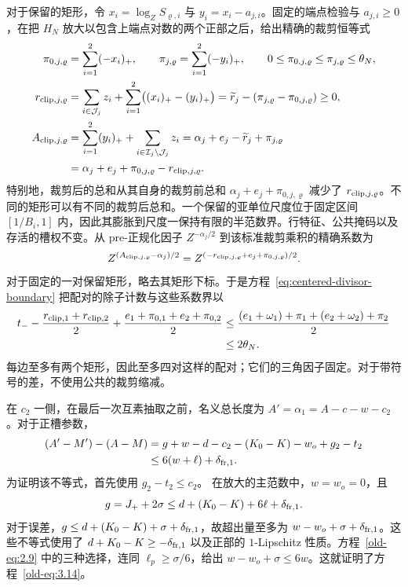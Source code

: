 对于保留的矩形，令 \(x_i=\log_ZS_{\varrho,i}\) 与 \(y_i=x_i-a_{j,i}\)。固定的端点检验与 \(a_{j,i}\ge0\)，在把 \(H_N\) 放大以包含上端点对数的两个正部之后，给出精确的裁剪恒等式
\begin{equation}
 \begin{aligned}
 \pi_{0,j,\varrho}&=\sum_{i=1}^2(-x_i)_+,\qquad
 \pi_{j,\varrho}=\sum_{i=1}^2(-y_i)_+,
 \qquad 0\le\pi_{0,j,\varrho}\le\pi_{j,\varrho}\le\theta_N,\\
 r_{{\rm clip},j,\varrho}
 &=\sum_{i\in\mathcal J_j}z_i+
       \sum_{i=1}^2\bigl((x_i)_+-(y_i)_+\bigr)
 =\widetilde r_j-(\pi_{j,\varrho}-\pi_{0,j,\varrho})\ge0,\\
 A_{{\rm clip},j,\varrho}
 &=\sum_{i=1}^2(y_i)_++\sum_{i\in\mathcal I_j\setminus\mathcal J_j}z_i
 =\alpha_j+e_j-\widetilde r_j+\pi_{j,\varrho}\\
 &=\alpha_j+e_j+\pi_{0,j,\varrho}-r_{{\rm clip},j,\varrho}.
 \end{aligned}
 \label{eq:centered-clipped-rectangle}
\end{equation}
特别地，裁剪后的总和从其自身的裁剪前总和 \(\alpha_j+e_j+\pi_{0,j,\varrho}\) 减少了 \(r_{{\rm clip},j,\varrho}\)。不同的矩形可以有不同的裁剪后总和。一个保留的亚单位尺度位于固定区间 \([1/B_i,1]\) 内，因此其膨胀到尺度一保持有限的半范数界。行特征、公共掩码以及存活的槽权不变。从 pre-正规化因子 \(Z^{-\alpha_j/2}\) 到该标准裁剪乘积的精确系数为
\[
 Z^{(A_{{\rm clip},j,\varrho}-\alpha_j)/2}
 =Z^{(-r_{{\rm clip},j,\varrho}+e_j+\pi_{0,j,\varrho})/2}.
\]
对于固定的一对保留矩形，略去其矩形下标。于是方程~\eqref{eq:centered-divisor-boundary} 把配对的除子计数与这些系数界以
\begin{equation}
 \begin{split}
 t_- -\frac{r_{{\rm clip},1}+r_{{\rm clip},2}}2
     +\frac{e_1+\pi_{0,1}+e_2+\pi_{0,2}}2
 &\le\frac{(e_1+\omega_1)+\pi_1+(e_2+\omega_2)+\pi_2}{2}\\
 &\le2\theta_N.
 \end{split}
 \label{eq:centered-clipped-shell}
\end{equation}
每边至多有两个矩形，因此至多四对这样的配对；它们的三角因子固定。对于带符号的差，不使用公共的裁剪缩减。

在 \(c_2\) 一侧，在最后一次互素抽取之前，名义总长度为 \(A'=\alpha_1=A-c-w-c_2\)。对于正槽参数，
\begin{equation}
 \begin{split}
 (A'-M')-(A-M)
 &=g+w-d-c_2-(K_0-K)-w_o+g_2-t_2\\
 &\le6(w+\ell)+\delta_{{\rm fr},1}.
 \end{split}
 \label{old-eq:3.14}
\end{equation}
为证明该不等式，首先使用 \(g_2-t_2\le c_2\)。
在放大的主范数中，\(w=w_o=0\)，且
\[
 g=J_++2\sigma
 \le d+(K_0-K)+6\ell+\delta_{{\rm fr},1}.
\]
对于误差，\(g\le d+(K_0-K)+\sigma+\delta_{{\rm fr},1}\)，故超出量至多为 \(w-w_o+\sigma+\delta_{{\rm fr},1}\)。这些不等式使用了 \(d+K_0-K\ge-\delta_{{\rm fr},1}\) 以及正部的 \(1\)-Lipschitz 性质。方程~\eqref{old-eq:2.9} 中的三种选择，连同 \(\ell_p\ge\sigma/6\)，给出 \(w-w_o+\sigma\le6w\)。这就证明了方程~\eqref{old-eq:3.14}。

